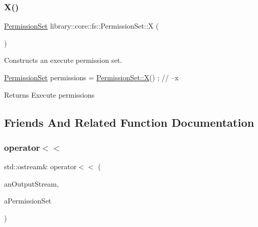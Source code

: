 \subsubsection{\texorpdfstring{X()}{X()}}
{\footnotesize\ttfamily \hyperlink{classlibrary_1_1core_1_1fs_1_1_permission_set}{Permission\+Set} library\+::core\+::fs\+::\+Permission\+Set\+::X (\begin{DoxyParamCaption}{ }\end{DoxyParamCaption})\hspace{0.3cm}{\ttfamily [static]}}



Constructs an execute permission set. 


\begin{DoxyCode}
\hyperlink{classlibrary_1_1core_1_1fs_1_1_permission_set_a8a6eb39cc2a8bca92a657d065d3e36ba}{PermissionSet} permissions = \hyperlink{classlibrary_1_1core_1_1fs_1_1_permission_set_a255d93c873ab812d7e6827de03de63e9}{PermissionSet::X}() ; \textcolor{comment}{// --x}
\end{DoxyCode}


\begin{DoxyReturn}{Returns}
Execute permissions 
\end{DoxyReturn}


\subsection{Friends And Related Function Documentation}
\mbox{\label{classlibrary_1_1core_1_1fs_1_1_permission_set_a8f2d68bb94d86dea76869abe148ea9f3}} 
\subsubsection{\texorpdfstring{operator$<$$<$}{operator<<}}
{\footnotesize\ttfamily std\+::ostream\& operator$<$$<$ (\begin{DoxyParamCaption}\item[{std\+::ostream \&}]{an\+Output\+Stream,  }\item[{const \hyperlink{classlibrary_1_1core_1_1fs_1_1_permission_set}{Permission\+Set} \&}]{a\+Permission\+Set }\end{DoxyParamCaption})\hspace{0.3cm}{\ttfamily [friend]}}



